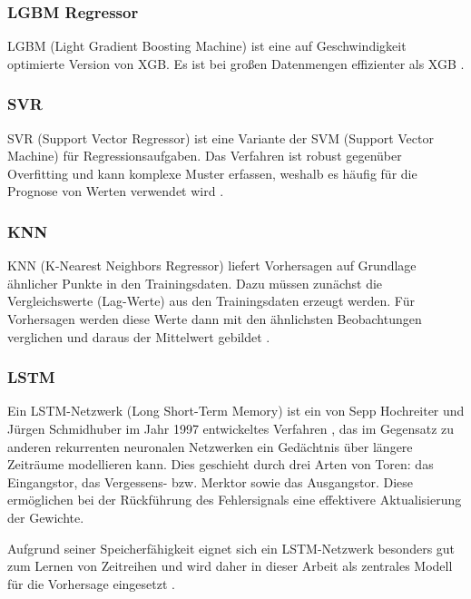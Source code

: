 \subsubsection{LGBM Regressor}

LGBM (Light Gradient Boosting Machine) ist eine auf Geschwindigkeit optimierte Version von XGB.
Es ist bei großen Datenmengen effizienter als XGB \cite{LightgbmLGBMRegressor}.

\subsubsection{SVR}

SVR (Support Vector Regressor) ist eine Variante der SVM (Support Vector Machine) für Regressionsaufgaben.
Das Verfahren ist robust gegenüber Overfitting und kann komplexe Muster erfassen, weshalb es häufig für die Prognose von Werten verwendet wird \cite{SVR}.

\subsubsection{KNN}

KNN (K-Nearest Neighbors Regressor) liefert Vorhersagen auf Grundlage ähnlicher Punkte in den Trainingsdaten.
Dazu müssen zunächst die Vergleichswerte (Lag-Werte) aus den Trainingsdaten erzeugt werden.
Für Vorhersagen werden diese Werte dann mit den ähnlichsten Beobachtungen verglichen und daraus der Mittelwert gebildet \cite{Knearest2026}.

\subsubsection{LSTM}

Ein LSTM-Netzwerk (Long Short-Term Memory) ist ein von Sepp Hochreiter und Jürgen Schmidhuber im Jahr 1997 entwickeltes Verfahren \cite{Long2026}, das im Gegensatz zu anderen rekurrenten neuronalen Netzwerken ein Gedächtnis über längere Zeiträume modellieren kann.
Dies geschieht durch drei Arten von Toren: das Eingangstor, das Vergessens- bzw. Merktor sowie das Ausgangstor.
Diese ermöglichen bei der Rückführung des Fehlersignals eine effektivere Aktualisierung der Gewichte.

Aufgrund seiner Speicherfähigkeit eignet sich ein LSTM-Netzwerk besonders gut zum Lernen von Zeitreihen und wird daher in dieser Arbeit als zentrales Modell für die Vorhersage eingesetzt \cite{Long2026}.



